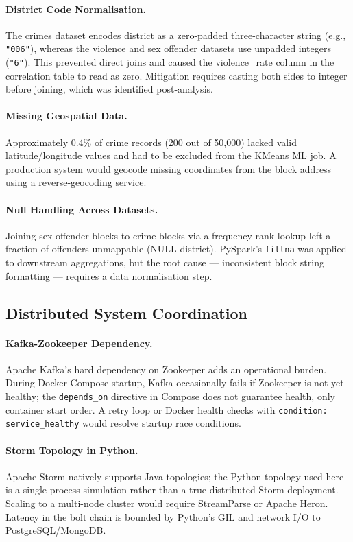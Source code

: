 \documentclass[11pt,a4paper]{article}
\begin{document}
\paragraph{District Code Normalisation.}
The crimes dataset encodes district as a zero-padded three-character
string (e.g., \texttt{"006"}), whereas the violence and sex offender
datasets use unpadded integers (\texttt{"6"}). This prevented direct
joins and caused the violence\_rate column in the correlation table to
read as zero. Mitigation requires casting both sides to integer before
joining, which was identified post-analysis.

\paragraph{Missing Geospatial Data.}
Approximately 0.4\% of crime records (200 out of 50{,}000) lacked valid
latitude/longitude values and had to be excluded from the KMeans ML job.
A production system would geocode missing coordinates from the block
address using a reverse-geocoding service.

\paragraph{Null Handling Across Datasets.}
Joining sex offender blocks to crime blocks via a frequency-rank lookup
left a fraction of offenders unmappable (NULL district). PySpark's
\texttt{fillna} was applied to downstream aggregations, but the root
cause — inconsistent block string formatting — requires a data
normalisation step.

\subsection{Distributed System Coordination}

\paragraph{Kafka-Zookeeper Dependency.}
Apache Kafka's hard dependency on Zookeeper adds an operational burden.
During Docker Compose startup, Kafka occasionally fails if Zookeeper is
not yet healthy; the \texttt{depends\_on} directive in Compose does not
guarantee health, only container start order. A retry loop or Docker
health checks with \texttt{condition: service\_healthy} would resolve
startup race conditions.

\paragraph{Storm Topology in Python.}
Apache Storm natively supports Java topologies; the Python topology
used here is a single-process simulation rather than a true distributed
Storm deployment. Scaling to a multi-node cluster would require
StreamParse or Apache Heron. Latency in the bolt chain is bounded by
Python's GIL and network I/O to PostgreSQL/MongoDB.
\end{document}
